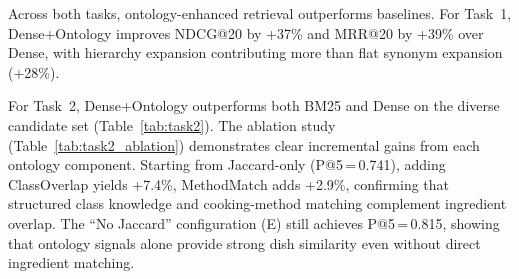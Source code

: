 Across both tasks, ontology-enhanced retrieval outperforms baselines. For Task~1, Dense+Ontology improves NDCG@20 by +37\% and MRR@20 by +39\% over Dense, with hierarchy expansion contributing more than flat synonym expansion (+28\%).

For Task~2, Dense+Ontology outperforms both BM25 and Dense on the diverse candidate set (Table~\ref{tab:task2}). The ablation study (Table~\ref{tab:task2_ablation}) demonstrates clear incremental gains from each ontology component. Starting from Jaccard-only (P@5\,=\,0.741), adding ClassOverlap yields +7.4\%, MethodMatch adds +2.9\%, confirming that structured class knowledge and cooking-method matching complement ingredient overlap. The ``No Jaccard'' configuration (E) still achieves P@5\,=\,0.815, showing that ontology signals alone provide strong dish similarity even without direct ingredient matching.
